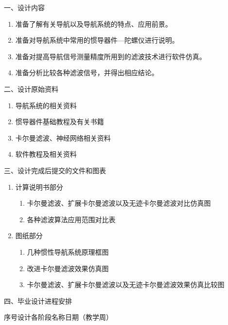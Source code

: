 \pagestyle{empty}
\vspace*{1ex}
\myoverlay%
{\cusong\sihao\hspace*{-2em} 一、设计内容}
     \begin{enumerate}
     \item 准备了解有关导航以及导航系统的特点、应用前景。
     \item 准备对导航系统中常用的惯导器件—陀螺仪进行说明。
     \item 准备对提高导航信号测量精度所用到的滤波技术进行软件仿真。
     \item 准备分析比较各种滤波信号，并得出相应结论。
     \end{enumerate}

\myhline%
{\cusong\sihao 二、设计原始资料}
     \begin{enumerate}
     \item 导航系统的相关资料
     \item 惯导器件基础教程及有关书籍
     \item 卡尔曼滤波、神经网络相关资料
     \item \Matlab{}软件教程及相关资料
     \end{enumerate}

\myhline%
{\cusong\sihao 三、设计完成后提交的文件和图表}
     \begin{enumerate}
     \item 计算说明书部分
     \begin{enumerate}
     \item 卡尔曼滤波、扩展卡尔曼滤波以及无迹卡尔曼滤波对比仿真图
     \item 各种滤波算法应用范围对比表
     \end{enumerate}
     \item 图纸部分
     \begin{enumerate}
     \item 几种惯性导航系统原理框图
     \item 改进卡尔曼滤波效果仿真图
     \item 卡尔曼滤波、扩展卡尔曼滤波以及无迹卡尔曼滤波效果仿真比较图
     \end{enumerate}
     \end{enumerate}

\myhline
{\cusong\sihao 四、毕业设计进程安排}

          \vspace{2em}
          {\heiti 序号\hspace{5em}设计各阶段名称\hspace{9em}日期（教学周）}


